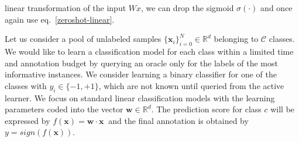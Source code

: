 \documentclass[10pt,twocolumn,letterpaper]{article}
\newcommand{\mb}[1]{\bm #1}
\begin{document}
linear transformation of the input $Wx$, we can drop the sigmoid $\sigma(\cdot)$ and once again use eq.~\eqref{zeroshot-linear}.%

Let us consider a pool of unlabeled samples $\{\mb{x}_i\}_{i=0}^N \in \mathbb{R}^d$  belonging to $\mathcal{C}$ classes.
We would like to learn a classification model for each class within a limited time and annotation
budget by querying an oracle only for the labels of the most informative instances.
We consider learning a binary classifier for one of the classes with $y_i\in\{-1,+1\}$, which are not known until queried from the active learner.
We focus on standard linear classification models with the learning parameters coded into the vector $\mb{w} \in \mathbb{R}^d$.
The prediction score for class $c$ will be expressed by $f(\mb{x}) = \mb{w}\cdot\mb{x}~$ and the final annotation is obtained by $y = sign(f(\mb{x}))$.
\end{document}
